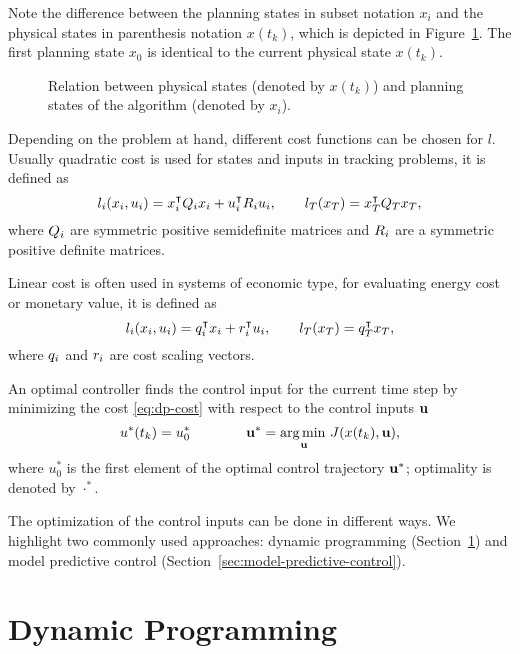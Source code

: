 Note the difference between the planning states in subset notation $x_i$ and the
physical states in parenthesis notation $x(t_k)$, which is depicted in
Figure~\ref{fig:mpc-notation}. The first planning state $x_0$ is identical to
the current physical state $x(t_k)$.

\begin{figure}
  \caption[Relation between physical states and planning states.]{Relation
between physical states (denoted by $x(t_k)$) and planning states of the
algorithm (denoted by $x_i$).}
  \label{fig:mpc-notation}
\end{figure}

Depending on the problem at hand, different cost functions can be chosen for
$l$. Usually quadratic cost is used for states and inputs in
tracking problems, it is defined as
\begin{equation}
  l_i(x_i, u_i) = x_i\T \SC_i x_i + u_i\T \CC_i u_i,
  \qq l_T (x_T) = x_T\T \SC_T x_T,
\end{equation}
where $\SC_i$ are symmetric positive semidefinite matrices and $\CC_i$ are
a symmetric positive definite matrices.

Linear cost is often used in systems of economic type, \eg for evaluating
energy cost or monetary value, it is defined as
\begin{equation}
  l_i(x_i, u_i) = \sc_i\T x_i + \cc_i\T u_i, \qq l_T (x_T) = \sc_T\T x_T,
\end{equation}
where $\sc_i$ and $\cc_i$ are cost scaling vectors.

An optimal controller finds the control input for the current time step
by minimizing the cost \eqref{eq:dp-cost} with respect to the control inputs
$\u$
\begin{equation}
  u^*(t_k) = u^*_0 \qqqq \u^* = \argmin_{\u} J(x(t_k), \u),
\end{equation}
where $u^*_0$ is the first element of the optimal control trajectory
$\u^*$; optimality is denoted by $\cdot^*$.

The optimization of the control inputs can be done in different ways. We
highlight two commonly used approaches: dynamic programming
(Section~\ref{sec:dynamic-programming}) and model predictive control
(Section~\ref{sec:model-predictive-control}).

\section{Dynamic Programming}
\label{sec:dynamic-programming}

